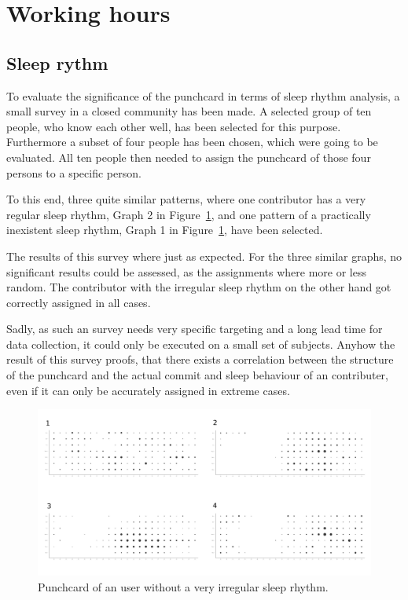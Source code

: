\section{Working hours}

\subsection{Sleep rythm}
To evaluate the significance of the punchcard in terms of sleep rhythm analysis, a small survey in a closed community has been made.
A selected group of ten people, who know each other well, has been selected for this purpose.
Furthermore a subset of four people has been chosen, which were going to be evaluated.
All ten people then needed to assign the punchcard of those four persons to a specific person.

To this end, three quite similar patterns, where one contributor has a very regular sleep rhythm, Graph 2 in Figure~\ref{fig:random-sleep-rhythm}, and one pattern of a practically inexistent sleep rhythm, Graph 1 in Figure~\ref{fig:random-sleep-rhythm}, have been selected.

The results of this survey where just as expected.
For the three similar graphs, no significant results could be assessed, as the assignments where more or less random.
The contributor with the irregular sleep rhythm on the other hand got correctly assigned in all cases.

Sadly, as such an survey needs very specific targeting and a long lead time for data collection, it could only be executed on a small set of subjects.
Anyhow the result of this survey proofs, that there exists a correlation between the structure of the punchcard and the actual commit and sleep behaviour of an contributer, even if it can only be accurately assigned in extreme cases.


\begin{figure}[H]
    \includegraphics[scale=0.16]{./graphs/analysis/survey_combined}
    \centering
    \caption{Punchcard of an user without a very irregular sleep rhythm.}\label{fig:random-sleep-rhythm}
\end{figure}


